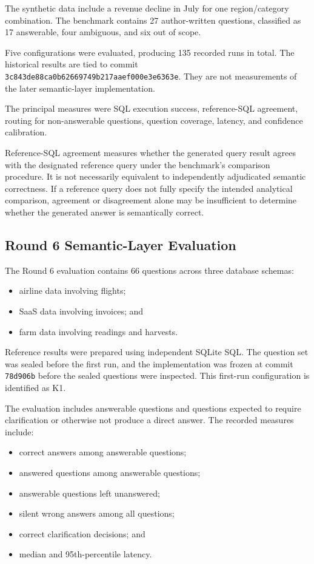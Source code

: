 \documentclass[conference]{IEEEtran}
\providecommand{\tightlist}{\setlength{\itemsep}{0pt}\setlength{\parskip}{0pt}}
\begin{document}
The synthetic data include a revenue decline in July for one region/category combination. The benchmark contains 27 author-written questions, classified as 17 answerable, four ambiguous, and six out of scope.

Five configurations were evaluated, producing 135 recorded runs in total. The historical results are tied to commit \texttt{3c843de88c\allowbreak{}a0b6266974\allowbreak{}9b217aaef0\allowbreak{}00e3e6363e}. They are not measurements of the later semantic-layer implementation.

The principal measures were SQL execution success, reference-SQL agreement, routing for non-answerable questions, question coverage, latency, and confidence calibration.

Reference-SQL agreement measures whether the generated query result agrees with the designated reference query under the benchmark's comparison procedure. It is not necessarily equivalent to independently adjudicated semantic correctness. If a reference query does not fully specify the intended analytical comparison, agreement or disagreement alone may be insufficient to determine whether the generated answer is semantically correct.

\subsection{Round 6 Semantic-Layer Evaluation}

The Round 6 evaluation contains 66 questions across three database schemas:

\begin{itemize}
\tightlist
\item
  airline data involving flights;
\item
  SaaS data involving invoices; and
\item
  farm data involving readings and harvests.
\end{itemize}

Reference results were prepared using independent SQLite SQL. The question set was sealed before the first run, and the implementation was frozen at commit \texttt{78d906b} before the sealed questions were inspected. This first-run configuration is identified as K1.

The evaluation includes answerable questions and questions expected to require clarification or otherwise not produce a direct answer. The recorded measures include:

\begin{itemize}
\tightlist
\item
  correct answers among answerable questions;
\item
  answered questions among answerable questions;
\item
  answerable questions left unanswered;
\item
  silent wrong answers among all questions;
\item
  correct clarification decisions; and
\item
  median and 95th-percentile latency.
\end{itemize}
\end{document}
